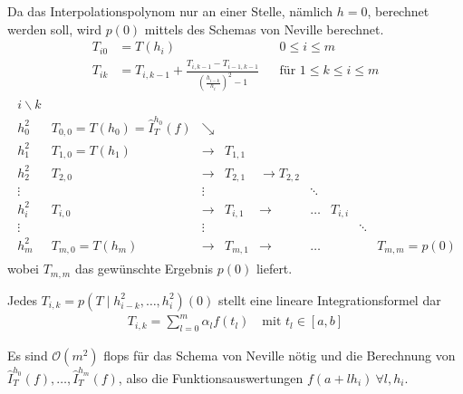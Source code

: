 Da das Interpolationspolynom nur an einer Stelle,
nämlich $h=0$, berechnet werden soll,
wird $p(0)$ mittels des Schemas von Neville berechnet.
\begin{align}\nonumber
  T_{i0} &= T(h_i) &&0\leq i\leq m \\
  T_{ik} &= T_{i,k-1} 
           + \frac{T_{i,k-1}-T_{i-1,k-1}}
           {\left(\frac{h_{i-k}}{h_i}\right)^2-1} 
                   &&\text{für } 1\leq k\leq i\leq m
                      \label{VII.3.6}
\end{align}
\begin{align*}
  \begin{array}{clccccccl}
    i\backslash k \\
    h_0^2 & T_{0,0}=T(h_0)=\hat{I}_T^{h_0}(f) & \searrow \\
    h_1^2 & T_{1,0}=T(h_1) & \longrightarrow & T_{1,1}\\
    h_2^2 & T_{2,0}& \longrightarrow &T_{2,1} & \longrightarrow T_{2,2} \\
    \vdots&&\vdots&&& \ddots\\
    h_i^2 & T_{i,0} & \longrightarrow & T_{i,1} & \longrightarrow & \dots &
                                                                             T_{i,i}\\
    \vdots&&\vdots&&&&& \ddots\\
    h_m^2 & T_{m,0}=T(h_m)&\longrightarrow & T_{m,1} &\longrightarrow &\dots&&&T_{m,m}=p(0)
  \end{array}
\end{align*}
wobei $T_{m,m}$ das gewünschte Ergebnis $p(0)$ liefert.

\begin{Beme}\label{7.3.3}
  Jedes $T_{i,k}=p(T\mid h_{i-k}^2,\dotsc, h_i^2)(0)$ 
  stellt eine lineare Integrationsformel dar
  \begin{gather*}
    T_{i,k}=\sum_{l=0}^m \alpha_lf(t_l)
    \quad \text{mit } t_l\in[a,b]
  \end{gather*}
\end{Beme}

\label{7.3.4}
Es sind $\mathcal{O}(m^2)$ flops für das Schema von Neville nötig
und die Berechnung von 
$\hat{I}_T^{h_0}(f),\dotsc, \hat{I}_T^{h_m}(f)$,
also die Funktionsauswertungen $f(a+lh_i)~\forall l,h_i$.

